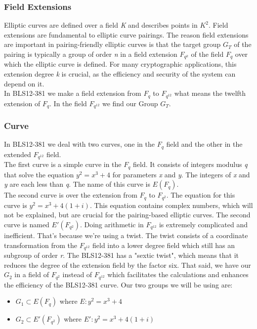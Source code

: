 \documentclass{article}
\begin{document}
\subsubsection{Field Extensions}
Elliptic curves are defined over a field \textit{K} and describes points in \(K^2\).
Field extensions are fundamental to elliptic curve pairings. The reason field extensions are important in pairing-friendly elliptic curves is that the target group \(G_T\) of the pairing is typically a group of order \textit{n} in a field extension \(F_{q^k}\) of the field \(F_q\) over which the elliptic curve is defined. For many cryptographic applications, this extension degree \textit{k} is crucial, as the efficiency and security of the system can depend on it. \\
In BLS12-381 we make a field extension from \(F_q\) to \(F_{q^{12}}\) what means the twelfth extension of \(F_q\). In the field \(F_{q^{12}}\) we find our Group \(G_T\).

\subsubsection{Curve}
In BLS12-381 we deal with two curves, one in the \(F_q\) field and the other in the extended \(F_{q^{12}}\) field. \\
The first curve is a simple curve in the \(F_q\) field. It consists of integers modulus \textit{q} that solve the equation \(y^2 = x^3 + 4\) for parameters \textit{x} and \textit{y}. The integers of \textit{x} and \textit{y} are each less than \textit{q}. The name of this curve is \(E(F_q)\). \\
The second curve is over the extension from \(F_q\) to \(F_{q^2}\). The equation for this curve is \(y^2 = x^3 + 4(1+i)\). This equation contains complex numbers, which will not be explained, but are crucial for the pairing-based elliptic curves. The second curve is named \(E'(F_{q^2})\). Doing arithmetic in \(F_{q^{12}}\) is extremely complicated and inefficient. That's because we're using a twist. The twist consists of a coordinate transformation from the \(F_{q^{12}}\) field into a lower degree field which still has an subgroup of order \textit{r}. The BLS12-381 has a "sextic twist", which means that it reduces the degree of the extension field by the factor six. That said, we have our \(G_2\) in a field of \(F_{q^2}\) instead of \(F_{q^{12}}\) which facilitates the calculations and enhances the efficiency of the BLS12-381 curve. \break
Our two groups we will be using are: \\
\begin{center}
\begin{itemize}
    \item \(G_1 \subset E(F_q)\) where \(E : y^2 = x^3 + 4\)
    \item \(G_2 \subset E'(F_{q^2})\) where \(E' : y^2 = x^3 + 4(1+i)\)
\end{itemize}
\end{center}
\end{document}

